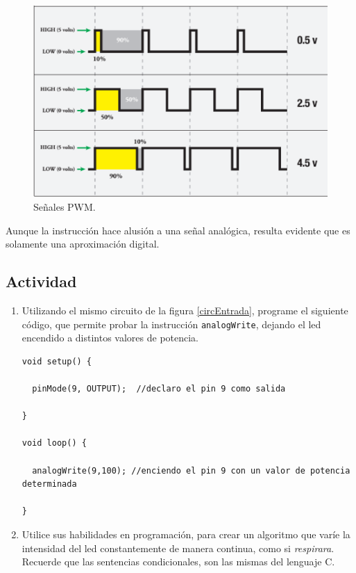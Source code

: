 \documentclass[letterpaper, 10pt]{report}
\begin{document}
\begin{figure}[h]
\centering
\includegraphics[scale=0.5]{pwm.png}
\caption{Señales PWM. \label{pwm}}
\end{figure}

Aunque la instrucción hace alusión a una señal analógica, resulta evidente que es solamente una aproximación digital.

\subsection{Actividad}
\begin{enumerate}
\item Utilizando el mismo circuito de la figura \ref{circEntrada}, programe el siguiente código, que permite probar la instrucción \texttt{analogWrite}, dejando el led encendido a distintos valores de potencia.

\begin{lstlisting}[style=myArduino] 
void setup() {
  
  pinMode(9, OUTPUT);  //declaro el pin 9 como salida

}

void loop() {

  analogWrite(9,100); //enciendo el pin 9 con un valor de potencia determinada 

}
\end{lstlisting}

\item Utilice sus habilidades en programación, para crear un algoritmo que varíe la intensidad del led constantemente de manera continua, como si \emph{respirara}. Recuerde que las sentencias condicionales, son las mismas del lenguaje C.

\end{enumerate}
\end{document}
